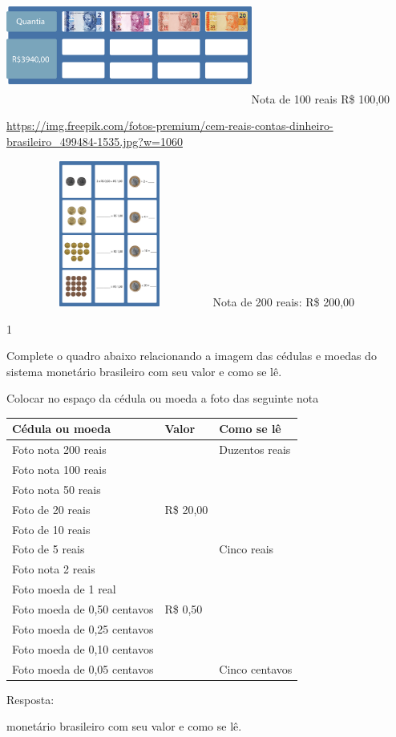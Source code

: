 \begin{escolha}
{\includegraphics[width=3.18285in,height=1.50833in]{media/image70.png}Nota
de 100 reais R\$ 100,00

\url{https://img.freepik.com/fotos-premium/cem-reais-contas-dinheiro-brasileiro_499484-1535.jpg?w=1060}

\includegraphics[width=2.68333in,height=1.88913in]{media/image71.png}Nota
de 200 reais: R\$ 200,00}


\num{1}

Complete o quadro abaixo relacionando a imagem das cédulas e moedas do
sistema monetário brasileiro com seu valor e como se lê.

Colocar no espaço da cédula ou moeda a foto das seguinte nota

\begin{longtable}[]{@{}lll@{}}
\toprule
Cédula ou moeda & Valor & Como se lê\tabularnewline
\midrule
\endhead
Foto nota 200 reais & & Duzentos reais\tabularnewline
Foto nota 100 reais & &\tabularnewline
Foto nota 50 reais & &\tabularnewline
Foto de 20 reais & R\$ 20,00 &\tabularnewline
Foto de 10 reais & &\tabularnewline
Foto de 5 reais & & Cinco reais\tabularnewline
Foto nota 2 reais & &\tabularnewline
Foto moeda de 1 real & &\tabularnewline
Foto moeda de 0,50 centavos & R\$ 0,50 &\tabularnewline
Foto moeda de 0,25 centavos & &\tabularnewline
Foto moeda de 0,10 centavos & &\tabularnewline
Foto moeda de 0,05 centavos & & Cinco centavos\tabularnewline
\bottomrule
\end{longtable}

Resposta:

monetário brasileiro com seu valor e como se lê.


\end{escolha}
